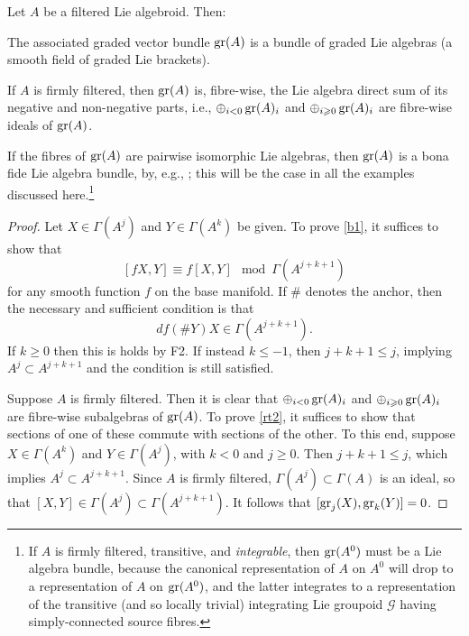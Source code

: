 \documentclass[leqno,12pt]{amsart} %
\begin{document}
\begin{proposition} Let $A$ be a filtered Lie algebroid. Then:
  \begin{conditions}
  \item The associated graded vector bundle $\operatorname{\operatorname{gr}}(A)$ is a bundle of graded Lie
    algebras (a smooth field of graded Lie brackets). \label{b1}
  \item If $A$ is firmly filtered, then $\operatorname{\operatorname{gr}}(A)$ is, fibre-wise, the Lie algebra
    direct sum of its negative and non-negative parts, i.e., $\oplus_{i<0}\operatorname{\operatorname{gr}}(A)_i$
    and $\oplus_{i\geqslant 0}\operatorname{\operatorname{gr}}(A)_i$ are fibre-wise ideals of $\operatorname{\operatorname{gr}}(A)$. \label{rt2}
    \end{conditions}
\end{proposition}
%
\begin{remark}
  If the fibres of $\operatorname{\operatorname{gr}}(A)$ are pairwise isomorphic Lie algebras, then $\operatorname{\operatorname{gr}}(A)$ is
  a bona fide Lie algebra bundle, by, e.g., \cite[Theorem 6.4.5]{Mackenzie_05}; this will
  be the case in all the examples discussed here.\footnote{If $A$ is firmly filtered,
  transitive, and {\em integrable}, then $\operatorname{\operatorname{gr}}(A^0)$ must be a Lie algebra bundle,
  because the canonical representation of $A$ on $A^0$ will drop to a representation of
  $A$ on $\operatorname{\operatorname{gr}}(A^0)$, and the latter integrates to a representation of the transitive
  (and so locally trivial) integrating Lie groupoid ${\mathcal G} $ having
  simply-connected source fibres.}
\end{remark}

\begin{proof}
  Let $X \in \Gamma(A^j) $ and $Y \in \Gamma(A^k)$ be given. To prove \eqref{b1}, it
  suffices to show that
  $$ [fX, Y] \equiv f[X, Y] \mod \Gamma(A^{j+k+1})$$
  for any smooth function $f$ on the base manifold. If $\#$ denotes
  the anchor, then the necessary and sufficient condition is
  that
  $$df(\#Y)X \in \Gamma(A^{j + k + 1}).$$
  If $k \ge 0$ then this is holds by F2. If instead $k \le -1 $, then $j + k + 1 \le j$,
  implying $A^j \subset A^{j + k + 1}$ and the condition is still satisfied.

  Suppose $A$ is firmly filtered. Then it is clear that $\oplus_{i<0}\operatorname{\operatorname{gr}}(A)_i$ and
  $\oplus_{i\geqslant 0}\operatorname{\operatorname{gr}}(A)_i$ are fibre-wise subalgebras of $\operatorname{\operatorname{gr}}(A)$. To prove
  \eqref{rt2}, it suffices to show that sections of one of these commute with sections of
  the other. To this end, suppose $X \in \Gamma(A^k)$ and $Y \in \Gamma(A^j)$, with $k<0$
  and $j\ge 0$. Then $j + k + 1 \le j$, which implies $A^j \subset A^{j+k+1}$. Since $A$
  is firmly filtered, $\Gamma(A^j) \subset \Gamma(A)$ is an ideal, so that
  $[X, Y] \in \Gamma(A^j) \subset \Gamma(A^{j + k + 1})$. It follows that
  $[\operatorname{\operatorname{gr}}_j(X), \operatorname{\operatorname{gr}}_k(Y)]=0$.
\end{proof}
\end{document}
